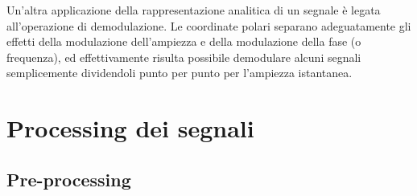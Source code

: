 \documentclass[a4paper, 12pt]{book}
\begin{document}
Un’altra applicazione della rappresentazione analitica di un segnale è legata all'operazione di demodulazione.
Le coordinate polari separano adeguatamente gli effetti della modulazione dell’ampiezza e della modulazione della fase (o frequenza), ed effettivamente risulta possibile demodulare alcuni segnali semplicemente dividendoli punto per punto per l'ampiezza istantanea.



\chapter{Processing dei segnali}


\section{Pre-processing}
\end{document}
